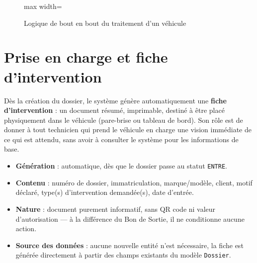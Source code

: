\documentclass[11pt,a4paper]{report}
\begin{document}
\begin{figure}[h!]
\centering
\begin{adjustbox}{max width=\linewidth}
\end{adjustbox}
\caption{Logique de bout en bout du traitement d'un véhicule}
\end{figure}

\section{Prise en charge et fiche d'intervention}

Dès la création du dossier, le système génère automatiquement une \textbf{fiche
d'intervention} : un document résumé, imprimable, destiné à être placé physiquement
dans le véhicule (pare-brise ou tableau de bord). Son rôle est de donner à tout
technicien qui prend le véhicule en charge une vision immédiate de ce qui est attendu,
sans avoir à consulter le système pour les informations de base.

\begin{itemize}[leftmargin=1cm]
\item \textbf{Génération} : automatique, dès que le dossier passe au statut \texttt{ENTRE}.
\item \textbf{Contenu} : numéro de dossier, immatriculation, marque/modèle, client,
      motif déclaré, type(s) d'intervention demandée(s), date d'entrée.
\item \textbf{Nature} : document purement informatif, sans QR code ni valeur d'autorisation
      --- à la différence du Bon de Sortie, il ne conditionne aucune action.
\item \textbf{Source des données} : aucune nouvelle entité n'est nécessaire, la fiche est
      générée directement à partir des champs existants du modèle \texttt{Dossier}.
\end{itemize}
\end{document}

